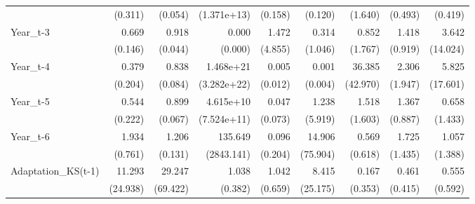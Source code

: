 \begin{table}[htbp]
\begin{tabular}{l*{8}{D{.}{.}{-1}}}
                    &     (0.311)         &     (0.054)         & (1.371e+13)         &     (0.158)         &     (0.120)         &     (1.640)         &     (0.493)         &     (0.419)         \\
Year\_t-3            &       0.669\sym{*}  &       0.918\sym{*}  &       0.000\sym{**} &       1.472         &       0.314         &       0.852         &       1.418         &       3.642         \\
                    &     (0.146)         &     (0.044)         &     (0.000)         &     (4.855)         &     (1.046)         &     (1.767)         &     (0.919)         &    (14.024)         \\
Year\_t-4            &       0.379\sym{*}  &       0.838\sym{*}  &   1.468e+21\sym{**} &       0.005\sym{**} &       0.001\sym{**} &      36.385\sym{***}&       2.306         &       5.825         \\
                    &     (0.204)         &     (0.084)         & (3.282e+22)         &     (0.012)         &     (0.004)         &    (42.970)         &     (1.947)         &    (17.601)         \\
Year\_t-5            &       0.544\sym{\%}  &       0.899         &   4.615e+10\sym{\%}  &       0.047\sym{*}  &       1.238         &       1.518         &       1.367         &       0.658         \\
                    &     (0.222)         &     (0.067)         & (7.524e+11)         &     (0.073)         &     (5.919)         &     (1.603)         &     (0.887)         &     (1.433)         \\
Year\_t-6            &       1.934\sym{*}  &       1.206\sym{*}  &     135.649         &       0.096         &      14.906         &       0.569         &       1.725         &       1.057         \\
                    &     (0.761)         &     (0.131)         &  (2843.141)         &     (0.204)         &    (75.904)         &     (0.618)         &     (1.435)         &     (1.388)         \\
Adaptation\_KS(t-1)  &      11.293         &      29.247         &       1.038         &       1.042         &       8.415         &       0.167         &       0.461         &       0.555         \\
                    &    (24.938)         &    (69.422)         &     (0.382)         &     (0.659)         &    (25.175)         &     (0.353)         &     (0.415)         &     (0.592)         \\

\end{tabular}
\end{table}
